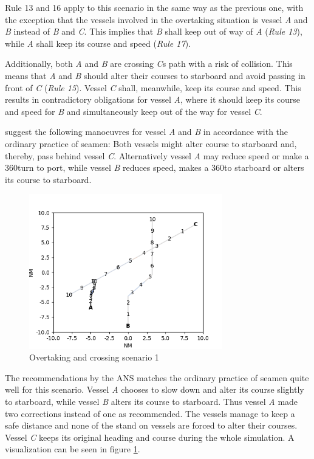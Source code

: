 Rule 13 and 16 apply to this scenario in the same way as the previous one, with the exception that the vessels involved in the overtaking situation is vessel \textit{A} and \textit{B} instead of \textit{B} and \textit{C}. This implies that \textit{B} shall keep out of way of \textit{A} (\textit{Rule 13}), while \textit{A} shall keep its course and speed (\textit{Rule 17}).

Additionally, both \textit{A} and \textit{B} are crossing \textit{C}s path with a risk of collision. This means that \textit{A} and \textit{B} should alter their courses to starboard and avoid passing in front of \textit{C} (\textit{Rule 15}). Vessel \textit{C} shall, meanwhile, keep its course and speed. This results in contradictory obligations for vessel  \textit{A}, where it should keep its course and speed for \textit{B} and simultaneously keep out of the way for vessel \textit{C}.

\textcite{ecolreg_overtaking-and-crossing} suggest the following manoeuvres for vessel \textit{A} and \textit{B} in accordance with the ordinary practice of seamen:
Both vessels might alter course to starboard and, thereby, pass behind vessel \textit{C}. Alternatively vessel \textit{A} may reduce speed or make a 360\textdegree turn to port, while vessel \textit{B} reduces speed, makes a 360\textdegree to starboard or alters its course to starboard.

\begin{figure}[H]
    \centering
    \includegraphics[width=0.75\textwidth,height=0.75\textheight,keepaspectratio]{../src/img/overtaking_crossing_res.png}
    \caption{Overtaking and crossing scenario 1}
    \label{fig:overtaking-and-crossing-res}
\end{figure}

The recommendations by the ANS matches the ordinary practice of seamen quite well for this scenario. Vessel \textit{A} chooses to slow down and alter its course slightly to starboard, while vessel \textit{B} alters its course to starboard. Thus vessel \textit{A} made two corrections instead of one as recommended.  The vessels manage to keep a safe distance and none of the stand on vessels are forced to alter their courses. Vessel \textit{C} keeps its original heading and course during the whole simulation. A visualization can be seen in figure \ref {fig:overtaking-and-crossing-res}.

